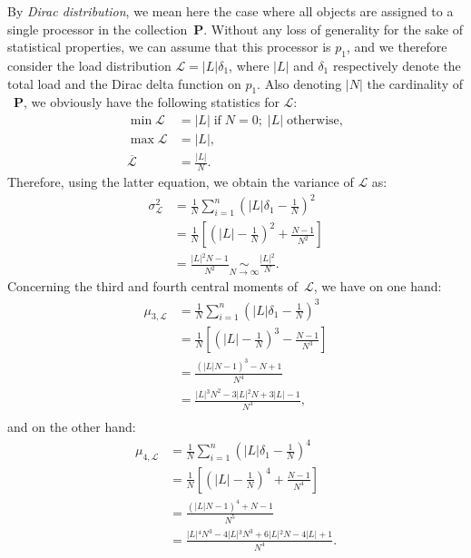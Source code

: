 By \emph{Dirac distribution}, we mean here the case where all objects
are assigned to a single processor in the
collection~$\mathbf{P}$. Without any loss of generality for the sake
of statistical properties, we can assume that this processor is $p_1$,
and we therefore consider the load distribution
$\mathcal{L}=\vert{L}\vert{}\delta_1$, where $\vert{L}\vert$ and $\delta_1$
respectively denote the total load and the Dirac delta function on
$p_1$.
Also denoting $\vert{N}\vert$ the cardinality of ~$\mathbf{P}$, we
obviously have the following statistics for $\mathcal{L}$:
\begin{align*}
\min{\mathcal{L}}
&= \vert{L}\vert{} \;\mathrm{if}\;N=0;\;\vert{L}\vert{}\;\mathrm{otherwise},\\
\max{\mathcal{L}}
&= \vert{L}\vert{},\\
\overline{\mathcal{L}}
&= \frac{\vert{L}\vert{}}{N}.
\end{align*}
Therefore, using the latter equation, we obtain the variance of
$\mathcal{L}$ as:
\begin{align*}
\sigma_{\mathcal{L}}^2
&= \frac{1}{N}\sum_{i=1}^n\left(
\vert{L}\vert{}\delta_1 - \frac{1}{N}\right)^2\\
&= \frac{1}{N}\left[\left(
\vert{L}\vert{} - \frac{1}{N}\right)^2 +\frac{N-1}{N^2}\right]\\
&= \frac{\vert{L}\vert{}^2N-1}{N^2}
\underset{N\to\infty}{\sim}\frac{\vert{L}\vert{}^2}{N}.
\end{align*}
Concerning the third and fourth central moments of~$\mathcal{L}$, we
have on one hand:
\begin{align*}
\mu_{3,\mathcal{L}}
&= \frac{1}{N}\sum_{i=1}^n\left(
\vert{L}\vert{}\delta_1 - \frac{1}{N}\right)^3\\
&= \frac{1}{N}\left[\left(
\vert{L}\vert{} - \frac{1}{N}\right)^3 - \frac{N-1}{N^3}\right]\\
&= \frac{(\vert{L}\vert{}N-1)^3 - N + 1}{N^4}\\
&= \frac{\vert{L}\vert{}^3N^2 - 3\vert{L}\vert{}^2N
+ 3\vert{L}\vert{}- 1}{N^3},\\
\end{align*}
and on the other hand:
\begin{align*}
\mu_{4,\mathcal{L}}
&= \frac{1}{N}\sum_{i=1}^n\left(
\vert{L}\vert{}\delta_1 - \frac{1}{N}\right)^4\\
&= \frac{1}{N}\left[\left(
\vert{L}\vert{} - \frac{1}{N}\right)^4 +\frac{N-1}{N^4}\right]\\
&= \frac{(\vert{L}\vert{}N-1)^4 + N - 1}{N^5}\\
&= \frac{\vert{L}\vert{}^4N^3 - 4\vert{L}\vert{}^3N^3
+ 6\vert{L}\vert{}^2N - 4\vert{L}\vert{} + 1}{N^4}.\\
\end{align*}
